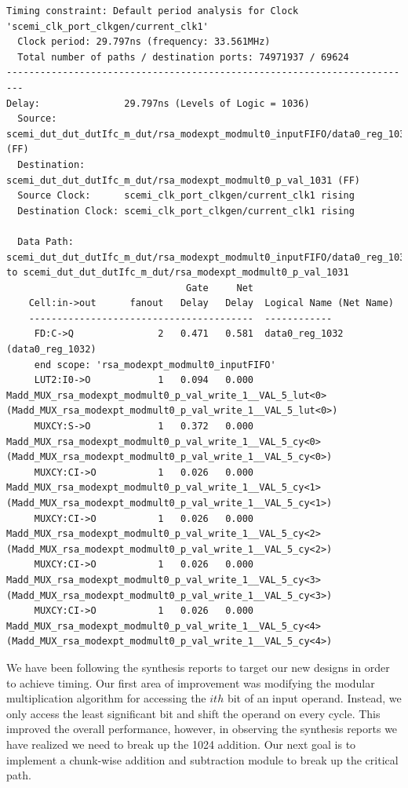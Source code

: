 \documentclass[12pt]{article}
\begin{document}
\begin{verbatim}
Timing constraint: Default period analysis for Clock 'scemi_clk_port_clkgen/current_clk1'
  Clock period: 29.797ns (frequency: 33.561MHz)
  Total number of paths / destination ports: 74971937 / 69624
-------------------------------------------------------------------------
Delay:               29.797ns (Levels of Logic = 1036)
  Source:            scemi_dut_dut_dutIfc_m_dut/rsa_modexpt_modmult0_inputFIFO/data0_reg_1032 (FF)
  Destination:       scemi_dut_dut_dutIfc_m_dut/rsa_modexpt_modmult0_p_val_1031 (FF)
  Source Clock:      scemi_clk_port_clkgen/current_clk1 rising
  Destination Clock: scemi_clk_port_clkgen/current_clk1 rising

  Data Path: scemi_dut_dut_dutIfc_m_dut/rsa_modexpt_modmult0_inputFIFO/data0_reg_1032 to scemi_dut_dut_dutIfc_m_dut/rsa_modexpt_modmult0_p_val_1031
                                Gate     Net
    Cell:in->out      fanout   Delay   Delay  Logical Name (Net Name)
    ----------------------------------------  ------------
     FD:C->Q               2   0.471   0.581  data0_reg_1032 (data0_reg_1032)
     end scope: 'rsa_modexpt_modmult0_inputFIFO'
     LUT2:I0->O            1   0.094   0.000  Madd_MUX_rsa_modexpt_modmult0_p_val_write_1__VAL_5_lut<0> (Madd_MUX_rsa_modexpt_modmult0_p_val_write_1__VAL_5_lut<0>)
     MUXCY:S->O            1   0.372   0.000  Madd_MUX_rsa_modexpt_modmult0_p_val_write_1__VAL_5_cy<0> (Madd_MUX_rsa_modexpt_modmult0_p_val_write_1__VAL_5_cy<0>)
     MUXCY:CI->O           1   0.026   0.000  Madd_MUX_rsa_modexpt_modmult0_p_val_write_1__VAL_5_cy<1> (Madd_MUX_rsa_modexpt_modmult0_p_val_write_1__VAL_5_cy<1>)
     MUXCY:CI->O           1   0.026   0.000  Madd_MUX_rsa_modexpt_modmult0_p_val_write_1__VAL_5_cy<2> (Madd_MUX_rsa_modexpt_modmult0_p_val_write_1__VAL_5_cy<2>)
     MUXCY:CI->O           1   0.026   0.000  Madd_MUX_rsa_modexpt_modmult0_p_val_write_1__VAL_5_cy<3> (Madd_MUX_rsa_modexpt_modmult0_p_val_write_1__VAL_5_cy<3>)
     MUXCY:CI->O           1   0.026   0.000  Madd_MUX_rsa_modexpt_modmult0_p_val_write_1__VAL_5_cy<4> (Madd_MUX_rsa_modexpt_modmult0_p_val_write_1__VAL_5_cy<4>)
\end{verbatim}

We have been following the synthesis reports to target our new designs in order to achieve timing.  Our first area of improvement was modifying the modular multiplication algorithm for accessing the $ith$ bit of an input operand. Instead, we only access the least significant bit and shift the operand on every cycle. This improved the overall performance, however, in observing the synthesis reports we have realized we need to break up the 1024 addition.  
Our next goal is to implement a chunk-wise addition and subtraction module to break up the critical path.
\end{document}
